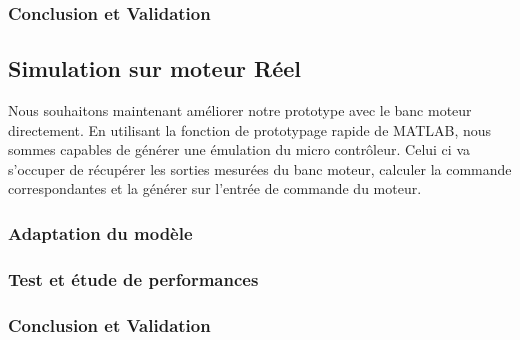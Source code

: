 		\subsubsection{Conclusion et Validation}
	\subsection{Simulation sur moteur Réel}
		Nous souhaitons maintenant améliorer notre prototype avec le banc moteur directement. En utilisant la fonction de prototypage rapide de MATLAB, nous sommes capables de générer une émulation du micro contrôleur. Celui ci va s'occuper de récupérer les sorties mesurées du banc moteur, calculer la commande correspondantes et la générer sur l'entrée de commande du moteur. 
		\subsubsection{Adaptation du modèle}
		\subsubsection{Test et étude de performances}
		\subsubsection{Conclusion et Validation}
		
